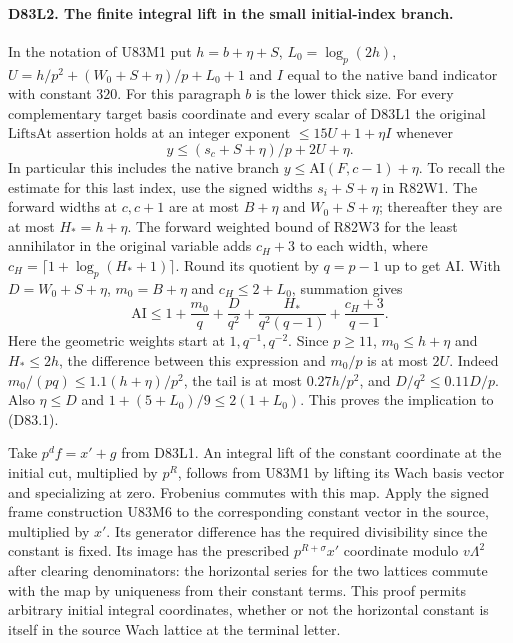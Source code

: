 \paragraph{D83L2. The finite integral lift in the small initial-index branch.}
In the notation of U83M1 put $h=b+\eta+S$, $L_0=\log_p(2h)$,
$U=h/p^2+(W_0+S+\eta)/p+L_0+1$ and $I$ equal to the native
band indicator with constant $320$. For this paragraph $b$ is
the lower thick size. For every complementary target basis
coordinate and every scalar of D83L1 the original
$\mathrm{LiftsAt}$ assertion holds at an integer exponent
$\le15U+1+\eta I$ whenever
\[
             y\le (s_c+S+\eta)/p+2U+\eta .                 \tag{D83.1}
\]
In particular this includes the native branch
$y\le\mathrm{AI}(F,c-1)+\eta$. To recall the estimate for this
last index, use the signed widths $s_i+S+\eta$ in R82W1.
The forward widths at $c,c+1$ are at most $B+\eta$ and
$W_0+S+\eta$; thereafter they are at most $H_*=h+\eta$.
The forward weighted bound of R82W3 for the least annihilator
in the original variable adds $c_H+3$ to each width, where
$c_H=\lceil1+\log_p(H_*+1)\rceil$. Round its quotient by
$q=p-1$ up to get $\mathrm{AI}$. With $D=W_0+S+\eta$,
$m_0=B+\eta$ and $c_H\le2+L_0$, summation gives
\[
  \mathrm{AI}\le1+\frac{m_0}{q}+\frac{D}{q^2}
       +\frac{H_*}{q^2(q-1)}+\frac{c_H+3}{q-1}.
\]
Here the geometric weights start at $1,q^{-1},q^{-2}$.
Since $p\ge11$, $m_0\le h+\eta$ and $H_*\le2h$, the difference
between this expression and $m_0/p$ is at most $2U$. Indeed
$m_0/(pq)\le1.1(h+\eta)/p^2$, the tail is at most
$0.27h/p^2$, and $D/q^2\le0.11D/p$. Also $\eta\le D$ and
$1+(5+L_0)/9\le2(1+L_0)$.
This proves the implication to (D83.1).

Take $p^d f=x'+g$ from D83L1. An integral lift of the constant
coordinate at the initial cut, multiplied by $p^R$, follows from
U83M1 by lifting its Wach basis vector and specializing at zero.
Frobenius commutes with this map. Apply the signed frame
construction U83M6 to the corresponding constant vector in the
source, multiplied by $x'$. Its generator difference has the
required divisibility since the constant is fixed. Its image has
the prescribed $p^{R+\sigma}x'$ coordinate modulo $v\Lambda^2$
after clearing denominators: the horizontal series for the two
lattices commute with the map by uniqueness from their constant
terms. This proof permits arbitrary initial integral coordinates,
whether or not the horizontal constant is itself in the source
Wach lattice at the terminal letter.

